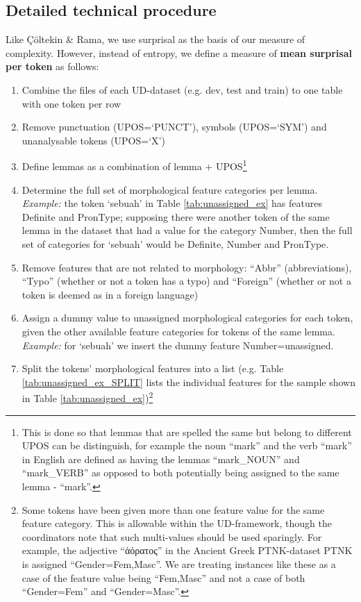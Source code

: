 \documentclass[USenglish]{article}
\begin{document}
\subsection{Detailed technical procedure}
\label{detailed_procedure}
Like Çöltekin \& Rama, we use surprisal as the basis of our measure of complexity.
However, instead of entropy, we define a measure of \textbf{mean surprisal per token} as follows:
\begin{enumerate}
\item Combine the files of each UD-dataset (e.g. dev, test and train) to one table with one token per row
\item Remove punctuation (UPOS=`PUNCT'), symbols (UPOS=`SYM') and unanalysable tokens (UPOS=`X')
\item Define lemmas as a combination of lemma + UPOS\footnote{This is done so that lemmas that are spelled the same but belong to different UPOS can be distinguish, for example the noun ``mark'' and the verb ``mark'' in English are defined as having the lemmas ``mark\_NOUN'' and ``mark\_VERB'' as opposed to both potentially being assigned to the same lemma - ``mark''.} 
\item Determine the full set of morphological feature categories per lemma. \textit{Example:} the token `sebuah' in Table \ref{tab:unassigned_ex} has features Definite and PronType; supposing there were another token of the same lemma in the dataset that had a value for the category Number, then the full set of categories for `sebuah' would be Definite, Number and PronType.
\item Remove features that are not related to morphology: ``Abbr'' (abbreviations), ``Typo'' (whether or not a token has a typo) and ``Foreign'' (whether or not a token is deemed as in a foreign language)
\item Assign a dummy value to unassigned morphological categories for each token, given the other available feature categories for tokens of the same lemma. \textit{Example:} for `sebuah' we insert the dummy feature Number=unassigned.
\item Split the tokens' morphological features into a list (e.g. Table \ref{tab:unassigned_ex_SPLIT} lists the individual features for the sample shown in Table \ref{tab:unassigned_ex})\footnote{Some tokens have been given more than one feature value for the same feature category. This is allowable within the UD-framework, though the coordinators note that such multi-values should be used sparingly. For example, the adjective ``ἀόρατος'' in the Ancient Greek PTNK-dataset PTNK is assigned ``Gender=Fem,Masc''. We are treating instances like these as a case of the feature value being ``Fem,Masc'' and not a case of both ``Gender=Fem'' and ``Gender=Masc''.}

\end{enumerate}
\end{document}
